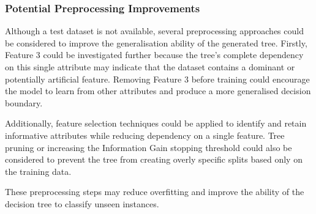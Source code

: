\documentclass[conference,a4paper]{IEEEtran}
\begin{document}
\subsubsection{Potential Preprocessing Improvements}

Although a test dataset is not available, several preprocessing approaches could
be considered to improve the generalisation ability of the generated tree.
Firstly, Feature 3 could be investigated further because the tree's complete
dependency on this single attribute may indicate that the dataset contains a
dominant or potentially artificial feature. Removing Feature 3 before training
could encourage the model to learn from other attributes and produce a more
generalised decision boundary.

Additionally, feature selection techniques could be applied to identify and
retain informative attributes while reducing dependency on a single feature.
Tree pruning or increasing the Information Gain stopping threshold could also be
considered to prevent the tree from creating overly specific splits based only on
the training data.

These preprocessing steps may reduce overfitting and improve the ability of the
decision tree to classify unseen instances.


\end{document}
